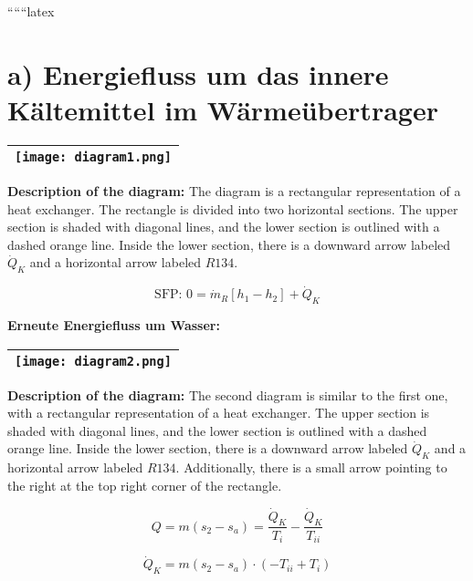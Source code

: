 ``````latex

\section*{a) Energiefluss um das innere Kältemittel im Wärmeübertrager}

\begin{center}
\begin{tabular}{|c|}
\hline
\begin{minipage}{0.9\textwidth}
\centering
\texttt{[image: diagram1.png]}
\end{minipage} \\
\hline
\end{tabular}
\end{center}

\textbf{Description of the diagram:} The diagram is a rectangular representation of a heat exchanger. The rectangle is divided into two horizontal sections. The upper section is shaded with diagonal lines, and the lower section is outlined with a dashed orange line. Inside the lower section, there is a downward arrow labeled \( \dot{Q}_K \) and a horizontal arrow labeled \( R134 \).

\[
\text{SFP: } 0 = \dot{m}_R [h_1 - h_2] + \dot{Q}_K
\]

\textbf{Erneute Energiefluss um Wasser:}

\begin{center}
\begin{tabular}{|c|}
\hline
\begin{minipage}{0.9\textwidth}
\centering
\texttt{[image: diagram2.png]}
\end{minipage} \\
\hline
\end{tabular}
\end{center}

\textbf{Description of the diagram:} The second diagram is similar to the first one, with a rectangular representation of a heat exchanger. The upper section is shaded with diagonal lines, and the lower section is outlined with a dashed orange line. Inside the lower section, there is a downward arrow labeled \( \dot{Q}_K \) and a horizontal arrow labeled \( R134 \). Additionally, there is a small arrow pointing to the right at the top right corner of the rectangle.

\[
Q = m (s_{2} - s_{a}) = \frac{\dot{Q}_K}{T_i} - \frac{\dot{Q}_K}{T_{ii}}
\]

\[
\dot{Q}_K = m (s_{2} - s_{a}) \cdot (-T_{ii} + T_{i})
\]

